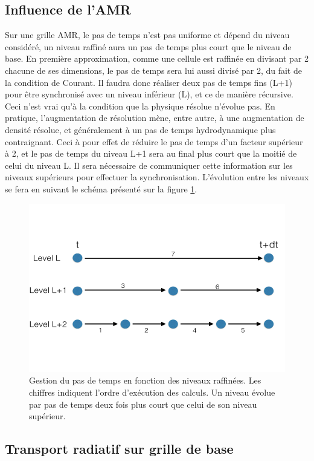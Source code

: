 \subsection{Influence de l'AMR}

Sur une grille \ac{AMR}, le pas de temps n'est pas uniforme et dépend du niveau considéré, un niveau raffiné aura un pas de temps plus court que le niveau de base.
En première approximation, comme une cellule est raffinée en divisant par 2 chacune de ses dimensions, le pas de temps sera lui aussi divisé par 2, du fait de la condition de Courant.
Il faudra donc réaliser deux pas de temps fins (L+1) pour être synchronisé avec un niveau inférieur (L), et ce de manière récursive.
Ceci n'est vrai qu'à la condition que la physique résolue n'évolue pas.
En pratique, l'augmentation de résolution mène, entre autre, à une augmentation de densité résolue, et généralement à un pas de temps hydrodynamique plus contraignant.
Ceci à pour effet de réduire le pas de temps d'un facteur supérieur à 2, et le pas de temps du niveau L+1 sera au final plus court que la moitié de celui du niveau L.
Il sera nécessaire de communiquer cette information sur les niveaux supérieurs pour effectuer la synchronisation.
L'évolution entre les niveaux se fera en suivant le schéma présenté sur la figure \ref{fig:timestep}.

\begin{figure}
\includegraphics[width=.8\linewidth]{img/02/tstep.png}
\caption[Pas de temps AMR]{Gestion du pas de temps en fonction des niveaux raffinées.
Les chiffres indiquent l'ordre d’exécution des calculs.
Un niveau évolue par pas de temps deux fois plus court que celui de son niveau supérieur.
\label{fig:timestep}}
\end{figure}


\subsection{Transport radiatif sur grille de base}
\label{sec:crta}

